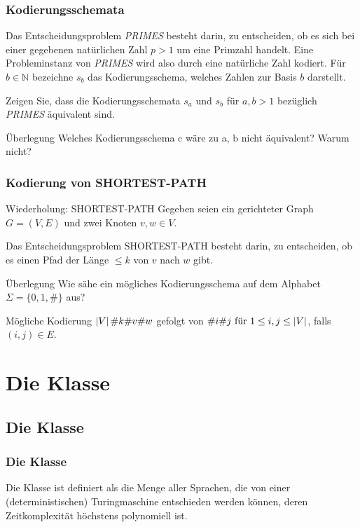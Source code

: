 \begin{frame}
 \frametitle{Kodierungsschemata}
 Das Entscheidungsproblem \textit{PRIMES} besteht darin, zu entscheiden, ob es sich bei einer gegebenen natürlichen Zahl $p>1$ um eine Primzahl handelt. 
Eine Probleminstanz von \textit{PRIMES} wird also durch eine natürliche Zahl kodiert. 
Für $b\in \mathbb{N}$ bezeichne $s_b$ das Kodierungsschema, welches Zahlen zur Basis $b$ darstellt.

Zeigen Sie, dass die Kodierungsschemata $s_a$ und $s_b$ für $a,b>1$ bezüglich \textit{PRIMES} äquivalent sind.

\begin{block}{Überlegung}
 Welches Kodierungsschema c wäre zu a, b nicht äquivalent? Warum nicht?
\end{block}
\end{frame}

\begin{frame}
\frametitle{Kodierung von SHORTEST-PATH}
 \begin{block}{Wiederholung: SHORTEST-PATH}
  Gegeben seien ein gerichteter Graph $G = (V, E)$ und zwei Knoten $v, w \in V$.
  
  Das Entscheidungsproblem SHORTEST-PATH besteht darin, zu entscheiden, ob es einen Pfad der Länge $\leq k$ von $v$ nach $w$ gibt.
 \end{block}
 \begin{block}{Überlegung}
 Wie sähe ein mögliches Kodierungsschema auf dem Alphabet $\Sigma = \{0,1,\#\}$ aus?
 \end{block}
 \invincible \pause
 \begin{block}{Mögliche Kodierung}
 $\left\vert V \right\vert\#k\#v\#w$ gefolgt von $\#i\#j \text{ für } 1 \leq i,j \leq \left\vert V \right\vert$, falls $(i, j) \in E$.
 \end{block}
 
 \vincible
\end{frame}

\section{Die Klasse \classP}
\subsection{Die Klasse \classP}
\begin{frame}
\frametitle{Die Klasse \classP}
Die Klasse \classP{} ist definiert als die Menge aller Sprachen, die von einer (deterministischen) Turingmaschine entschieden werden können, deren Zeitkomplexität höchstens polynomiell ist.
\end{frame}

